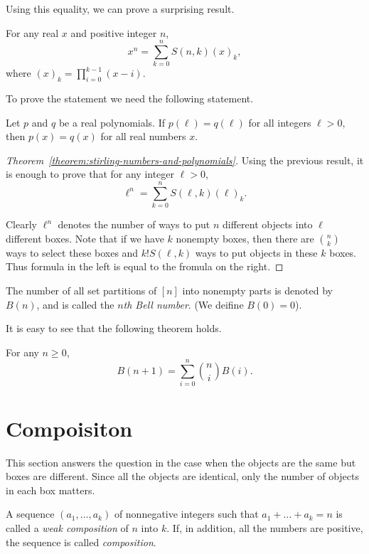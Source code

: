 Using this equality, we can prove a surprising result.
\begin{theorem}
\label{theorem:stirling-numbers-and-polynomials}
  For any real $x$ and positive integer $n$,
  \[
    x^n = \sum_{k = 0}^n S(n, k) (x)_k,
  \]
  where $(x)_k = \prod_{i = 0}^{k - 1} (x - i)$.
\end{theorem}

To prove the statement we need the following statement.
\begin{theorem}
  Let $p$ and $q$ be a real polynomials. If $p(\ell) = q(\ell)$ for all
  integers $\ell > 0$, then $p(x) = q(x)$ for all real numbers $x$.
\end{theorem}

\begin{proof}[Theorem~\ref{theorem:stirling-numbers-and-polynomials}]
  Using the previous result, it is enough to prove that
  for any integer $\ell > 0$,
  \[
    \ell^n = \sum_{k = 0}^n S(\ell, k) (\ell)_k.
  \]

  Clearly $\ell^n$ denotes the number of ways to put $n$ different
  objects into $\ell$ different boxes. Note that if we have $k$ nonempty
  boxes, then there are $\binom{n}{k}$ ways to select these boxes and
  $k! S(\ell, k)$ ways to put objects in these $k$ boxes. Thus formula in
  the left is equal to the fromula on the right.
\end{proof}

\begin{definition}
  The number of all set partitions of $[n]$ into nonempty parts
  is denoted by $B(n)$, and is called the \emph{$n$th Bell number}.
  (We deifine $B(0) = 0$).
\end{definition}


It is easy to see that the following theorem holds.
\begin{theorem}
  For any $n \ge 0$,
  \[
    B(n + 1) = \sum_{i = 0}^n \binom{n}{i} B(i).
  \]
\end{theorem}

\section{Compoisiton}
This section answers the question in the case when the objects
are the same but boxes are different. Since all the objects
are identical, only the number of objects in each box matters.

\begin{definition}
  A sequence $(a_1, \dots, a_k)$ of nonnegative integers such
  that $a_1 + \dots + a_k = n$ is called a \emph{weak composition}
  of $n$ into $k$. If, in addition, all the numbers are positive,
  the sequence is called \emph{composition}.
\end{definition}

